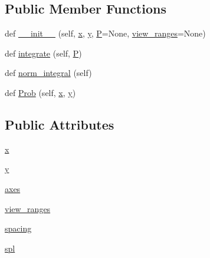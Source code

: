 \subsection*{Public Member Functions}
\begin{DoxyCompactItemize}
\item 
def \mbox{\hyperlink{classgetdist_1_1densities_1_1Density2D_ac12a300460a076fedffa0d8137fb2ba7}{\+\_\+\+\_\+init\+\_\+\+\_\+}} (self, \mbox{\hyperlink{classgetdist_1_1densities_1_1Density2D_a9e758913645291d7152c2ef3b2b2d1dc}{x}}, \mbox{\hyperlink{classgetdist_1_1densities_1_1Density2D_a12719ab4e796cf011a7c17c201468ab1}{y}}, \mbox{\hyperlink{classgetdist_1_1densities_1_1GridDensity_aad3d52edbfbf1a94ecbd0c779bd39dc2}{P}}=None, \mbox{\hyperlink{classgetdist_1_1densities_1_1Density2D_a1780324a42505b8fb79887be499a0aa4}{view\+\_\+ranges}}=None)
\item 
def \mbox{\hyperlink{classgetdist_1_1densities_1_1Density2D_a1867261071c004cd1b4b438a627a0264}{integrate}} (self, \mbox{\hyperlink{classgetdist_1_1densities_1_1GridDensity_aad3d52edbfbf1a94ecbd0c779bd39dc2}{P}})
\item 
def \mbox{\hyperlink{classgetdist_1_1densities_1_1Density2D_a626cf46833a5a5df4fdb42a0b7d2510c}{norm\+\_\+integral}} (self)
\item 
def \mbox{\hyperlink{classgetdist_1_1densities_1_1Density2D_a24e04a59b25556b75a32cc82272aef31}{Prob}} (self, \mbox{\hyperlink{classgetdist_1_1densities_1_1Density2D_a9e758913645291d7152c2ef3b2b2d1dc}{x}}, \mbox{\hyperlink{classgetdist_1_1densities_1_1Density2D_a12719ab4e796cf011a7c17c201468ab1}{y}})
\end{DoxyCompactItemize}
\subsection*{Public Attributes}
\begin{DoxyCompactItemize}
\item 
\mbox{\hyperlink{classgetdist_1_1densities_1_1Density2D_a9e758913645291d7152c2ef3b2b2d1dc}{x}}
\item 
\mbox{\hyperlink{classgetdist_1_1densities_1_1Density2D_a12719ab4e796cf011a7c17c201468ab1}{y}}
\item 
\mbox{\hyperlink{classgetdist_1_1densities_1_1Density2D_abafd7e697c4e194f88c207f71ba7ad8e}{axes}}
\item 
\mbox{\hyperlink{classgetdist_1_1densities_1_1Density2D_a1780324a42505b8fb79887be499a0aa4}{view\+\_\+ranges}}
\item 
\mbox{\hyperlink{classgetdist_1_1densities_1_1Density2D_a22fb264fe6afdaf8a56e90b6e42e9eb4}{spacing}}
\item 
\mbox{\hyperlink{classgetdist_1_1densities_1_1Density2D_a22bfbf19a872f9a0e1477e1a722a2e29}{spl}}
\end{DoxyCompactItemize}
